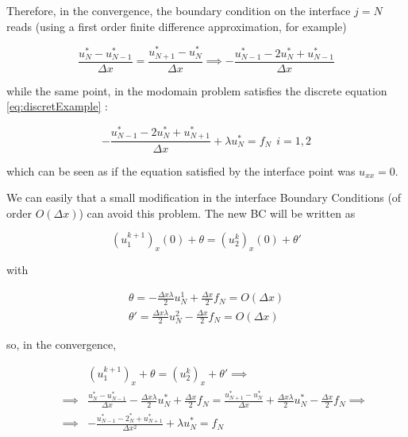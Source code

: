 \indent Therefore, in the convergence, the boundary condition on the interface $j = N$ reads (using a first order finite difference approximation, for example)

\begin{equation}
	\label{eq:discretExampleInterfaceCorrect}
	\frac{u^*_N - u^*_{N-1}}{\Delta x} = \frac{u^*_{N+1} - u^*_{N}}{\Delta x} \implies - \frac{u^*_{N-1} - 2u^*_N  + u^*_{N-1}}{\Delta x}
\end{equation}

\noindent while the same point, in the modomain problem satisfies the discrete equation \eqref{eq:discretExample} : 

\begin{equation}
\label{eq:discretExampleInterface}
- \frac{u_{N-1}^* - 2u_{N}^* + u_{N+1}^* }{\Delta x} + \lambda u_{N}^* = f_N \ \ i=1,2
\end{equation}

\noindent which can be seen as if the equation satisfied by the interface point was $u_{xx} = 0$.

\indent We can easily that a small modification in the interface Boundary Conditions (of order $O(\Delta x)$) can avoid this problem. The new BC will be written as

\begin{equation}
	(u_1^{k+1})_x(0) + \theta  = (u_2^{k})_x(0) + \theta'
\end{equation}

\noindent with

\begin{gather}
    \theta = -\frac{\Delta x \lambda}{2}u_N^1 + \frac{\Delta x}{2}f_N = O(\Delta x)\\
    \theta' = \frac{\Delta x \lambda}{2}u_N^2 - \frac{\Delta x}{2}f_N = O(\Delta x)
\end{gather}

\noindent so, in the convergence,

\begin{equation}
\begin{aligned}
&& 				&(u_1^{k+1})_x + \theta = (u_2^{k})_x + \theta' \implies \\ 
&& \implies  &\frac{u_N^* - u_{N-1}^*}{\Delta x} -\frac{\Delta x \lambda}{2}u_N^* + \frac{\Delta x}{2}f_N  =  \frac{u_{N+1}^* - u_{N}^*}{\Delta x} + \frac{\Delta x \lambda}{2}u_N^* - \frac{\Delta x}{2}f_N \implies \\
&& \implies  &  - \frac{u_{N-1}^{*} - 2_N^{*} + u_{N+1}^{*} }{\Delta x^2} + \lambda u_N^{*} = f_{N}
\end{aligned}
\end{equation}

